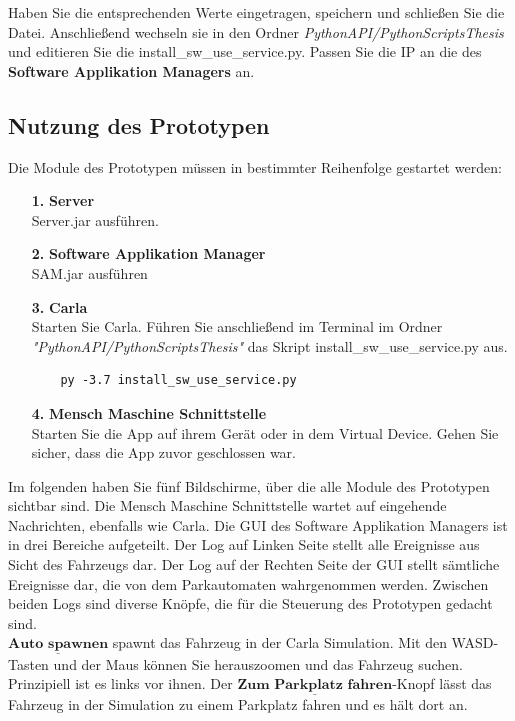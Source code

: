 \begin{itemize}
	Haben Sie die entsprechenden Werte eingetragen, speichern und schließen Sie die Datei. Anschließend wechseln sie in den Ordner \textit{PythonAPI/PythonScriptsThesis} und editieren Sie die install\_sw\_use\_service.py. Passen Sie die IP an die des \textbf{Software Applikation Managers} an. 
\end{itemize}

\subsection{Nutzung des Prototypen}
Die Module des Prototypen müssen in bestimmter Reihenfolge gestartet werden:
\begin{itemize}
	\item[\textbf{1.}]\textbf{Server}\\
	Server.jar ausführen.
	\item[\textbf{2.}]\textbf{Software Applikation Manager\\}
	SAM.jar ausführen
	\item[\textbf{3.}]\textbf{Carla\\}
	Starten Sie Carla. Führen Sie anschließend im Terminal im Ordner \textit{"PythonAPI/PythonScriptsThesis"} das Skript install\_sw\_use\_service.py aus.
	\begin{verbatim}
	py -3.7 install_sw_use_service.py
	\end{verbatim} 
	\item[\textbf{4.}]\textbf{Mensch Maschine Schnittstelle}\\
	Starten Sie die App auf ihrem Gerät oder in dem Virtual Device. Gehen Sie sicher, dass die App zuvor geschlossen war.
\end{itemize}
Im folgenden haben Sie fünf Bildschirme, über die alle Module des Prototypen sichtbar sind. Die Mensch Maschine Schnittstelle wartet auf eingehende Nachrichten, ebenfalls wie Carla. Die GUI des Software Applikation Managers ist in drei Bereiche aufgeteilt. Der Log auf Linken Seite stellt alle Ereignisse aus Sicht des Fahrzeugs dar. Der Log auf der Rechten Seite der GUI stellt sämtliche Ereignisse dar, die von dem Parkautomaten wahrgenommen werden. Zwischen beiden Logs sind diverse Knöpfe, die für die Steuerung des Prototypen gedacht sind.\\
$\underline{\textbf{Auto spawnen}}$ spawnt das Fahrzeug in der Carla Simulation. Mit den WASD-Tasten und der Maus können Sie herauszoomen und das Fahrzeug suchen. Prinzipiell ist es links vor ihnen. Der $\underline{\textbf{Zum Parkplatz fahren}}$-Knopf lässt das Fahrzeug in der Simulation zu einem Parkplatz fahren und es hält dort an.\\

